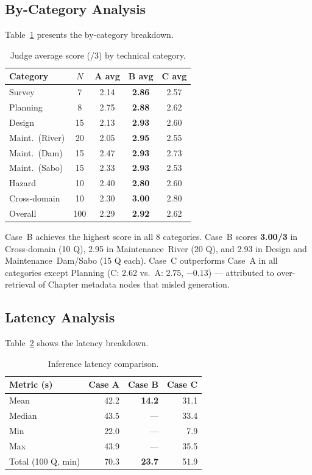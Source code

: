 \documentclass[twocolumn]{article}
\begin{document}
\subsection{By-Category Analysis}

Table~\ref{tab:category} presents the by-category breakdown.

\begin{table}[H]
  \centering
  \caption{Judge average score (/3) by technical category.}
  \label{tab:category}
  \begin{tabular}{lcccc}
    \toprule
    Category & $N$ & A avg & B avg & C avg \\
    \midrule
    Survey              & 7  & 2.14 & \textbf{2.86} & 2.57 \\
    Planning            & 8  & 2.75 & \textbf{2.88} & 2.62 \\
    Design              & 15 & 2.13 & \textbf{2.93} & 2.60 \\
    Maint.\ (River)    & 20 & 2.05 & \textbf{2.95} & 2.55 \\
    Maint.\ (Dam)      & 15 & 2.47 & \textbf{2.93} & 2.73 \\
    Maint.\ (Sabo)     & 15 & 2.33 & \textbf{2.93} & 2.53 \\
    Hazard              & 10 & 2.40 & \textbf{2.80} & 2.60 \\
    Cross-domain        & 10 & 2.30 & \textbf{3.00} & 2.80 \\
    \midrule
    Overall             & 100 & 2.29 & \textbf{2.92} & 2.62 \\
    \bottomrule
  \end{tabular}
\end{table}

Case~B achieves the highest score in all 8 categories.
Case~B scores \textbf{3.00/3} in Cross-domain (10 Q), 2.95 in Maintenance~River (20 Q),
and 2.93 in Design and Maintenance~Dam/Sabo (15 Q each).
Case~C outperforms Case~A in all categories except Planning
(C: 2.62 vs.\ A: 2.75, $-0.13$) --- attributed to over-retrieval of
Chapter metadata nodes that misled generation.

\subsection{Latency Analysis}

Table~\ref{tab:latency} shows the latency breakdown.

\begin{table}[H]
  \centering
  \caption{Inference latency comparison.}
  \label{tab:latency}
  \begin{tabular}{lrrr}
    \toprule
    Metric (s) & Case A & Case B & Case C \\
    \midrule
    Mean    & 42.2 & \textbf{14.2} & 31.1 \\
    Median  & 43.5 & --- & 33.4 \\
    Min     & 22.0 & --- &  7.9 \\
    Max     & 43.9 & --- & 35.5 \\
    \midrule
    Total (100 Q, min) & 70.3 & \textbf{23.7} & 51.9 \\
    \bottomrule
  \end{tabular}
\end{table}
\end{document}
